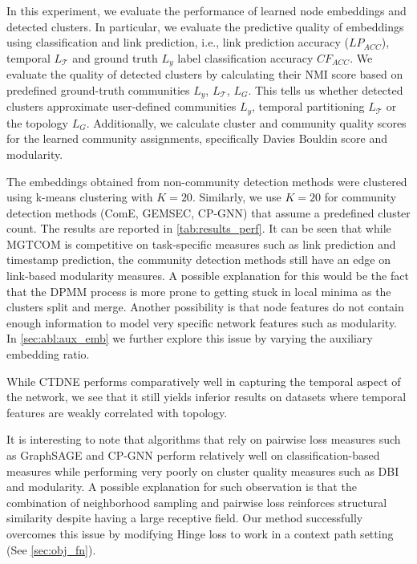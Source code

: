 In this experiment, we evaluate the performance of learned node embeddings and detected clusters.
In particular, we evaluate the predictive quality of embeddings using classification and link prediction, i.e., link prediction accuracy ($LP_{ACC}$), temporal $L_\mathcal{T}$ and ground truth $L_y$  label classification accuracy $CF_{ACC}$.
We evaluate the quality of detected clusters by calculating their NMI score based on predefined ground-truth communities $L_y$, $L_\mathcal{T}$, $L_G$.
This tells us whether detected clusters approximate user-defined communities $L_y$, temporal partitioning $L_\mathcal{T}$ or the topology $L_G$.
Additionally, we calculate cluster and community quality scores for the learned community assignments, specifically Davies Bouldin score and modularity.

The embeddings obtained from non-community detection methods were clustered using k-means clustering with $K=20$. Similarly, we use $K=20$ for community detection methods (ComE, GEMSEC, CP-GNN) that assume a predefined cluster count.
%
The results are reported in \cref{tab:results_perf}. 
It can be seen that while MGTCOM is competitive on task-specific measures such as link prediction and timestamp prediction, the community detection methods still have an edge on link-based modularity measures. 
A possible explanation for this would be the fact that the DPMM process is more prone to getting stuck in local minima as the clusters split and merge.
Another possibility is that node features do not contain enough information to model very specific network features such as modularity.
In \cref{sec:abl:aux_emb} we further explore this issue by varying the auxiliary embedding ratio.

While CTDNE performs comparatively well in capturing the temporal aspect of the network, we see that it still yields inferior results on datasets where temporal features are weakly correlated with topology.

It is interesting to note that algorithms that rely on pairwise loss measures such as GraphSAGE and CP-GNN perform relatively well on classification-based measures while performing very poorly on cluster quality measures such as DBI and modularity.
A possible explanation for such observation is that the combination of neighborhood sampling and pairwise loss reinforces structural similarity despite having a large receptive field.
Our method successfully overcomes this issue by modifying Hinge loss to work in a context path setting (See \cref{sec:obj_fn}).

